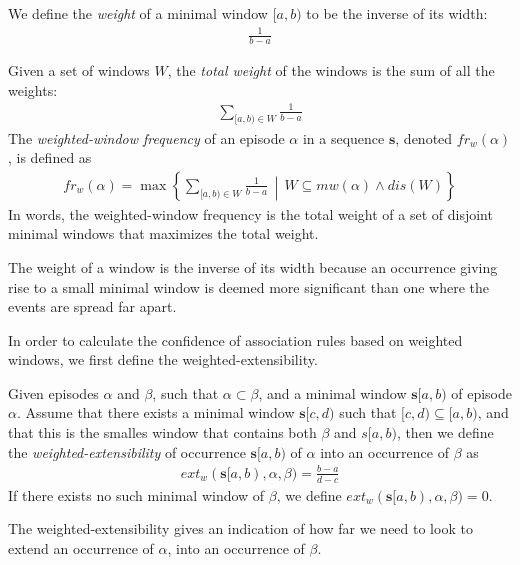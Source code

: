 \begin{definition}
We define the \emph{weight} of a minimal window $ [a, b) $ to be the inverse of its width:
\begin{align*}
\frac1{b - a}
\end{align*}

Given a set of windows $ W $, the \emph{total weight} of the windows is the sum of all the weights:
\begin{align*}
\sum_{[a,b) \in W} \frac1{b - a}
\end{align*}
The \emph{weighted-window frequency} \cite{cule2014marbles} of an episode $ \alpha $ in a sequence $ \boldsymbol{s} $, denoted $ fr_w(\alpha) $, is defined as
\begin{align*}
fr_w(\alpha) = \max \left\{ \sum_{[a, b) \in W}{\frac{1}{b - a}} \,\middle\vert\, W \subseteq mw(\alpha) \wedge dis(W) \right\}
\end{align*}
In words, the weighted-window frequency is the total weight of a set of disjoint minimal windows that maximizes the total weight.
\end{definition}

The weight of a window is the inverse of its width because an occurrence giving rise to a small minimal window is deemed more significant than one where the events are spread far apart.

In order to calculate the confidence of association rules based on weighted windows, we first define the weighted-extensibility.

\begin{definition}
Given episodes $ \alpha $ and $ \beta $, such that $ \alpha \subset \beta $, and a minimal window $ \boldsymbol{s}[a, b) $ of episode $ \alpha $. Assume that there exists a minimal window $ \boldsymbol{s}[c, d) $ such that $ [c, d) \subseteq [a, b) $, and that this is the smalles window that contains both $ \beta $ and $ s[a, b) $, then we define the \emph{weighted-extensibility} of occurrence $ \boldsymbol{s}[a, b) $ of $ \alpha $ into an occurrence of $ \beta $ as
\begin{align*}
ext_w(\boldsymbol{s}[a, b), \alpha, \beta) = \frac{b - a}{d - c}
\end{align*}
If there exists no such minimal window of $ \beta $, we define $ ext_w(\boldsymbol{s}[a, b), \alpha, \beta) = 0 $.
\end{definition}

The weighted-extensibility gives an indication of how far we need to look to extend an occurrence of $ \alpha $, into an occurrence of $ \beta $.

